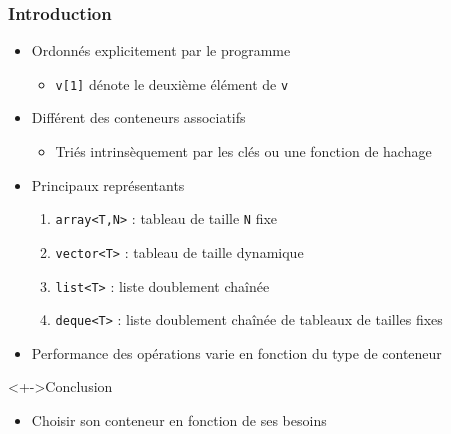 \begin{frame}
\frametitle{Introduction}
\begin{itemize}[<+->]
\item Ordonnés explicitement par le programme
	\begin{itemize}
	\item \lstinline|v[1]| dénote le deuxième élément de \texttt{v}
	\end{itemize}
\item Différent des conteneurs associatifs
	\begin{itemize}
	\item Triés intrinsèquement par les clés ou une fonction de hachage
	\end{itemize}
\item Principaux représentants
	\begin{enumerate}
	\item \texttt{array<T,N>} : tableau de taille \texttt{N} fixe
	\item \texttt{vector<T>} : tableau de taille dynamique
	\item \texttt{list<T>} : liste doublement chaînée
	\item \texttt{deque<T>} : liste doublement chaînée de tableaux de tailles fixes
	\end{enumerate}
\item Performance des opérations varie en fonction du type de conteneur
\end{itemize}
\begin{exampleblock}<+->{Conclusion}
	\begin{itemize}[<+->]
	\item Choisir son conteneur en fonction de ses besoins
	\end{itemize}
\end{exampleblock}
\end{frame}

